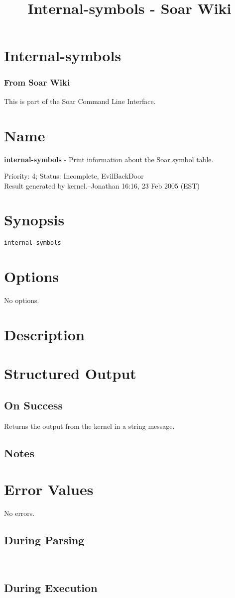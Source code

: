 \documentclass[10pt]{article}
\title{Internal-symbols - Soar Wiki}
\begin{document}
\section*{Internal-symbols}
\subsubsection*{From Soar Wiki}


 This is part of the Soar Command Line Interface. 
\section*{ Name }


 \textbf{internal-symbols}
 - Print information about the Soar symbol table. 


 Priority: 4; Status: Incomplete, EvilBackDoor\\ 
Result generated by kernel.--Jonathan 16:16, 23 Feb 2005 (EST) 
\section*{ Synopsis }
\begin{verbatim}
internal-symbols

\end{verbatim}
\section*{ Options }


 No options. 
\section*{ Description }
\section*{ Structured Output }
\subsection*{ On Success }


 Returns the output from the kernel in a string message. 
\subsection*{ Notes }
\section*{ Error Values }


 No errors. 
\subsection*{ During Parsing }


 \\ 

\subsection*{ During Execution }
\end{document}
